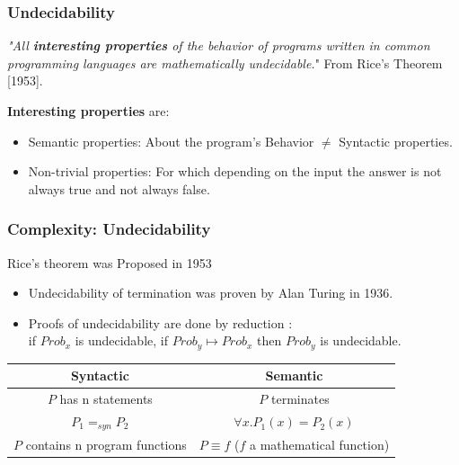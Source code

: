 \begin{frame}
\frametitle{Undecidability}
\textit{"All \textbf{interesting properties} of the behavior of programs written in common programming languages are mathematically undecidable.}"  From Rice's Theorem [1953].
\newline

\textbf{Interesting properties} are:
\begin{itemize}
	\item Semantic properties: About the program's Behavior $\neq$ Syntactic properties.
	\item Non-trivial properties: For which depending on the input the answer is not always true and not always false.
\end{itemize} 

\end{frame}


\begin{frame}
\frametitle{Complexity: Undecidability}


Rice's theorem was Proposed in 1953
\begin{itemize}
	\item Undecidability of termination was proven by Alan Turing in 1936.
	\item Proofs of undecidability are done by reduction :\\
	if $Prob_x$ is undecidable, if $Prob_y \mapsto Prob_x$ then  $Prob_y$ is undecidable.
	
\end{itemize}
\xxx
\footnotesize
\begin{tabular}{|c|c|}
	\hline
	Syntactic & Semantic\\
	\hline 
	$P$ has n statements &  $P$ terminates\\
	
	$P_1 =_{syn} P_2$  & $\forall x.P_1(x) = P_2(x)$\\
	$P$ contains n program functions &  $P \equiv f$ ($f$ a mathematical function)\\
	\hline
\end{tabular}

\end{frame}

